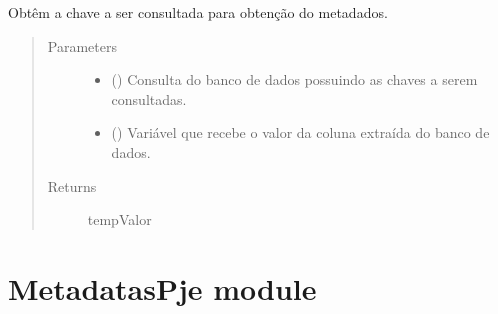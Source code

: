 \documentclass[letterpaper,10pt,english]{sphinxmanual}
\begin{document}

\begin{fulllineitems}
\label{\detokenize{MetadatasDje:MetadatasDje.valor}}
Obtêm a chave a ser consultada para obtenção do metadados.
\begin{quote}\begin{description}
\item[{Parameters}] \leavevmode\begin{itemize}
\item {} 
 () \textendash{} Consulta do banco de dados possuindo as chaves a serem consultadas.

\item {} 
 () \textendash{} Variável que recebe o valor da coluna extraída do banco de dados.

\end{itemize}

\item[{Returns}] \leavevmode
tempValor

\end{description}\end{quote}

\end{fulllineitems}



\section{MetadatasPje module}
\label{\detokenize{MetadatasPje:module-MetadatasPje}}\label{\detokenize{MetadatasPje:metadataspje-module}}\label{\detokenize{MetadatasPje::doc}}

\begin{fulllineitems}
\label{\detokenize{MetadatasPje:MetadatasPje.geraMetadatas}}
\end{fulllineitems}
\end{document}

